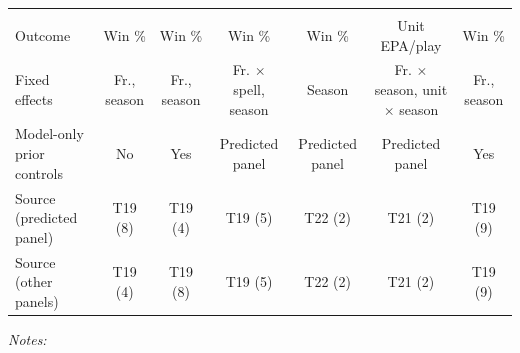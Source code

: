 \begin{table}[!h]
{\begin{threeparttable}
\begin{tabular}[t]{lcccccc}
\addlinespace[0.3em]
\multicolumn{7}{l}{\textbf{Specification}}\\
\hspace{1em}Outcome & Win \% & Win \% & Win \% & Win \% & Unit EPA/play & Win \%\\
\hspace{1em}Fixed effects & Fr., season & Fr., season & Fr. $\times$ spell, season & Season & Fr. $\times$ season, unit $\times$ season & Fr., season\\
\hspace{1em}Model-only prior controls & No & Yes & Predicted panel & Predicted panel & Predicted panel & Yes\\
\hspace{1em}Source (predicted panel) & T19 (8) & T19 (4) & T19 (5) & T22 (2) & T21 (2) & T19 (9)\\
\hspace{1em}Source (other panels) & T19 (4) & T19 (8) & T19 (5) & T22 (2) & T21 (2) & T19 (9)\\
\bottomrule
\end{tabular}
\begin{tablenotes}[para]
\item \textit{Notes:} 

\end{tablenotes}
\end{threeparttable}}
\end{table}
